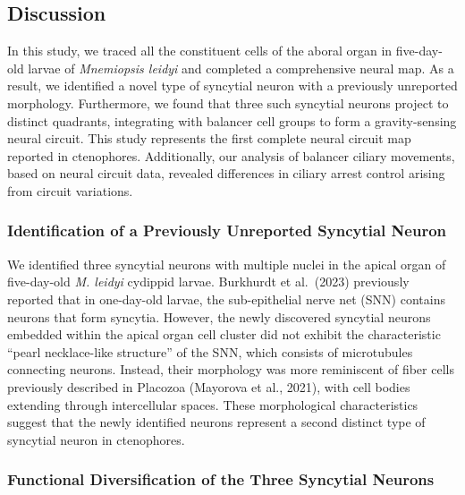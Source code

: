 \documentclass[
  11pt,
]{article}
\begin{document}
\subsection{Discussion}\label{discussion}

In this study, we traced all the constituent cells of the aboral organ
in five-day-old larvae of \emph{Mnemiopsis leidyi} and completed a
comprehensive neural map. As a result, we identified a novel type of
syncytial neuron with a previously unreported morphology. Furthermore,
we found that three such syncytial neurons project to distinct
quadrants, integrating with balancer cell groups to form a
gravity-sensing neural circuit. This study represents the first complete
neural circuit map reported in ctenophores. Additionally, our analysis
of balancer ciliary movements, based on neural circuit data, revealed
differences in ciliary arrest control arising from circuit variations.

\subsubsection{Identification of a Previously Unreported Syncytial
Neuron}\label{identification-of-a-previously-unreported-syncytial-neuron}

We identified three syncytial neurons with multiple nuclei in the apical
organ of five-day-old \emph{M. leidyi} cydippid larvae. Burkhurdt et
al.~(2023) previously reported that in one-day-old larvae, the
sub-epithelial nerve net (SNN) contains neurons that form syncytia.
However, the newly discovered syncytial neurons embedded within the
apical organ cell cluster did not exhibit the characteristic ``pearl
necklace-like structure'' of the SNN, which consists of microtubules
connecting neurons. Instead, their morphology was more reminiscent of
fiber cells previously described in Placozoa (Mayorova et al., 2021),
with cell bodies extending through intercellular spaces. These
morphological characteristics suggest that the newly identified neurons
represent a second distinct type of syncytial neuron in ctenophores.

\subsubsection{Functional Diversification of the Three Syncytial
Neurons}\label{functional-diversification-of-the-three-syncytial-neurons}
\end{document}
